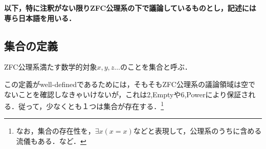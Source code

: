 \documentclass[uplatex, 12pt, a4paper, dvipdfmx]{jsarticle}
\begin{document}
\textbf{以下，特に注釈がない限りZFC公理系の下で議論しているものとし，記述には専ら日本語を用いる．}

\subsection{集合の定義}

\begin{shadebox}\begin{definition}[集合(メタ理論)]
	ZFC公理系満たす数学的対象$x,y,z\dots$のことを集合と呼ぶ．
\end{definition}\end{shadebox}
この定義がwell-definedであるためには，そもそもZFC公理系の議論領域は空でないことを確認しなきゃいけないが，これは2,Emptyや6,Powerにより保証される．従って，少なくとも１つは集合が存在する．\footnote{なお，集合の存在性を，$\exists x(x=x)$などと表現して，公理系のうちに含める流儀もある．\cite{Kunen}など．}
\end{document}
